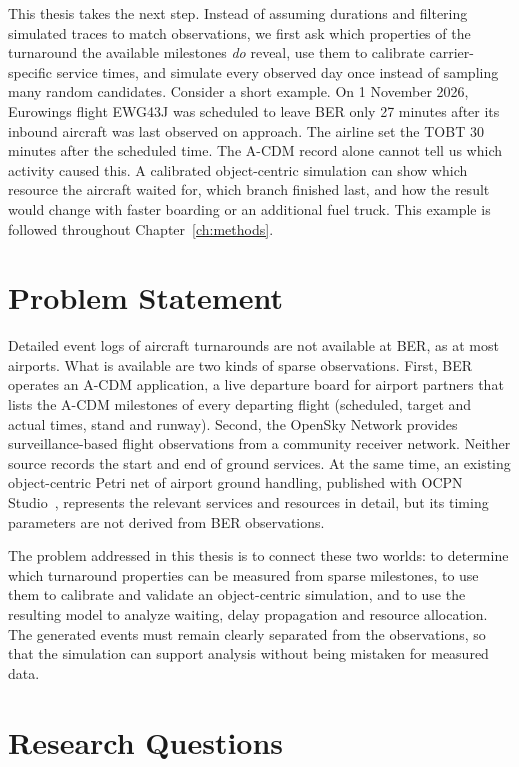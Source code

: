 This thesis takes the next step. Instead of assuming durations and filtering simulated traces to match observations, we first ask which properties of the turnaround the available milestones \emph{do} reveal, use them to calibrate carrier-specific service times, and simulate every observed day once instead of sampling many random candidates. Consider a short example. On 1 November 2026, Eurowings flight EWG43J was scheduled to leave BER only 27 minutes after its inbound aircraft was last observed on approach. The airline set the TOBT 30 minutes after the scheduled time. The A-CDM record alone cannot tell us which activity caused this. A calibrated object-centric simulation can show which resource the aircraft waited for, which branch finished last, and how the result would change with faster boarding or an additional fuel truck. This example is followed throughout Chapter~\ref{ch:methods}.

\section{Problem Statement}
\label{sec:problem}

Detailed event logs of aircraft turnarounds are not available at BER, as at most airports. What is available are two kinds of sparse observations. First, BER operates an A-CDM application, a live departure board for airport partners that lists the A-CDM milestones of every departing flight (scheduled, target and actual times, stand and runway). Second, the OpenSky Network provides surveillance-based flight observations from a community receiver network. Neither source records the start and end of ground services. At the same time, an existing object-centric Petri net of airport ground handling, published with OCPN Studio~\cite{ocpn_studio}, represents the relevant services and resources in detail, but its timing parameters are not derived from BER observations.

The problem addressed in this thesis is to connect these two worlds: to determine which turnaround properties can be measured from sparse milestones, to use them to calibrate and validate an object-centric simulation, and to use the resulting model to analyze waiting, delay propagation and resource allocation. The generated events must remain clearly separated from the observations, so that the simulation can support analysis without being mistaken for measured data.

\section{Research Questions}
\label{sec:rq}

